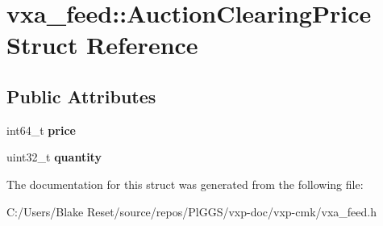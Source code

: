 \hypertarget{structvxa__feed_1_1_auction_clearing_price}{}\section{vxa\+\_\+feed\+::Auction\+Clearing\+Price Struct Reference}
\label{structvxa__feed_1_1_auction_clearing_price}
\subsection*{Public Attributes}
\begin{DoxyCompactItemize}
\item 
\mbox{\label{structvxa__feed_1_1_auction_clearing_price_a7e69861eeeb59aaa1322058d9179a296}} 
int64\+\_\+t {\bfseries price}
\item 
\mbox{\label{structvxa__feed_1_1_auction_clearing_price_a14f3cda1a7f2de1e4b2a82e91dbbe2d3}} 
uint32\+\_\+t {\bfseries quantity}
\end{DoxyCompactItemize}


The documentation for this struct was generated from the following file\+:\begin{DoxyCompactItemize}
\item 
C\+:/\+Users/\+Blake Reset/source/repos/\+Pl\+G\+G\+S/vxp-\/doc/vxp-\/cmk/vxa\+\_\+feed.\+h\end{DoxyCompactItemize}
